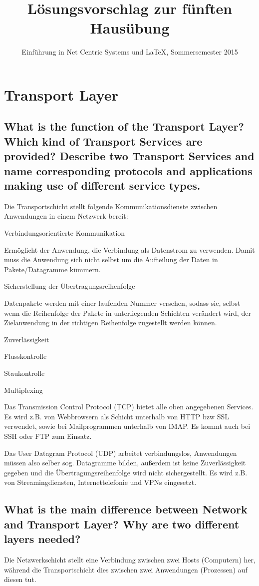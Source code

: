 \documentclass[a4paper,
			llpt,
			solution,
			accentcolor=tud2d,
			colorbacktitle
			]
			{tudexercise}
\title{Lösungsvorschlag zur fünften Hausübung}
\subtitle{Einführung in Net Centric Systems und \LaTeX, Sommersemester 2015}
\begin{document}
\maketitle
\section{Transport Layer}
\subsection{What is the function of the Transport Layer? Which kind of Transport Services are provided? Describe two Transport Services and name corresponding protocols and applications making use of different service types.}
Die Transportschicht stellt folgende Kommunikationsdienste zwischen Anwendungen in einem Netzwerk bereit:
\begin{compactenum}
	\item Verbindungsorientierte Kommunikation

	Ermöglicht der Anwendung, die Verbindung als Datenstrom zu verwenden. Damit muss die Anwendung sich nicht selbst um die Aufteilung der Daten in Pakete/Datagramme kümmern.
	\item Sicherstellung der Übertragungsreihenfolge

	Datenpakete werden mit einer laufenden Nummer versehen, sodass sie, selbst wenn die Reihenfolge der Pakete in unterliegenden Schichten verändert wird, der Zielanwendung in der richtigen Reihenfolge zugestellt werden können.
	\item Zuverlässigkeit
	\item Flusskontrolle
	\item Staukontrolle
	\item Multiplexing
\end{compactenum}
Das Transmission Control Protocol (TCP) bietet alle oben angegebenen Services. Es wird z.B. von Webbrowsern als Schicht unterhalb von HTTP bzw SSL verwendet, sowie bei Mailprogrammen unterhalb von IMAP. Es kommt auch bei SSH oder FTP zum Einsatz.

Das User Datagram Protocol (UDP) arbeitet verbindungslos, Anwendungen müssen also selber sog. Datagramme bilden, außerdem ist keine Zuverlässigkeit gegeben und die Übertragungsreihenfolge wird nicht sichergestellt. Es wird z.B. von Streamingdiensten, Internettelefonie und VPNs eingesetzt.


\subsection{What is the main difference between Network and Transport Layer? Why are two different layers needed?}
Die Netzwerkschicht stellt eine Verbindung zwischen zwei Hosts (Computern) her, während die Transportschicht dies zwischen zwei Anwendungen (Prozessen) auf diesen tut.
\end{document}
